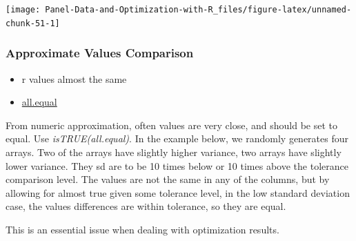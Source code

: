 \documentclass[
]{book}
\providecommand{\tightlist}{%
  \setlength{\itemsep}{0pt}\setlength{\parskip}{0pt}}
\begin{document}
\begin{center}\texttt{[image: Panel-Data-and-Optimization-with-R\_files/figure-latex/unnamed-chunk-51-1]} \end{center}

\hypertarget{approximate-values-comparison}{%
\subsubsection{Approximate Values Comparison}\label{approximate-values-comparison}}

\begin{itemize}
\tightlist
\item
  r values almost the same
\item
  \href{https://stat.ethz.ch/R-manual/R-patched/library/base/html/all.equal.html}{all.equal}
\end{itemize}

From numeric approximation, often values are very close, and should be set to equal. Use \emph{isTRUE(all.equal)}. In the example below, we randomly generates four arrays. Two of the arrays have slightly higher variance, two arrays have slightly lower variance. They sd are to be 10 times below or 10 times above the tolerance comparison level. The values are not the same in any of the columns, but by allowing for almost true given some tolerance level, in the low standard deviation case, the values differences are within tolerance, so they are equal.

This is an essential issue when dealing with optimization results.
\end{document}
